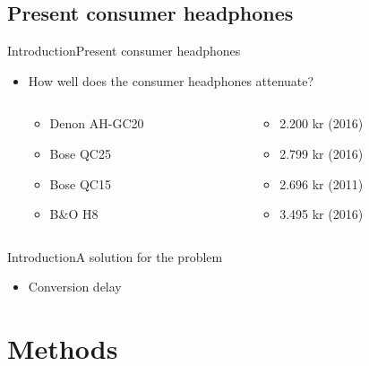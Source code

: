 \subsection{Present consumer headphones}
\begin{frame}{Introduction}{Present consumer headphones}
	\begin{itemize}	
	\item How well does the consumer headphones attenuate?
	\begin{columns}
		\begin{column}{0.27\textwidth}
		\begin{itemize}
			\item Denon AH-GC20
			\item Bose QC25 
			\item Bose QC15 	
			\item B\&O H8 	
		\end{itemize}
		\end{column}
		\begin{column}{0.6\textwidth} 
		\begin{itemize}
			\item[] 2.200 kr (2016)
			\item[] 2.799 kr (2016)
			\item[] 2.696 kr (2011)
			\item[] 3.495 kr (2016)
		\end{itemize}
		\end{column}
	\end{columns}
	\end{itemize}			
	\begin{center}
		
	\end{center}	
\end{frame}





\begin{frame}{Introduction}{A solution for the problem}		
	\begin{itemize}
		\item Conversion delay
	\end{itemize}
\end{frame}


\section{Methods}







